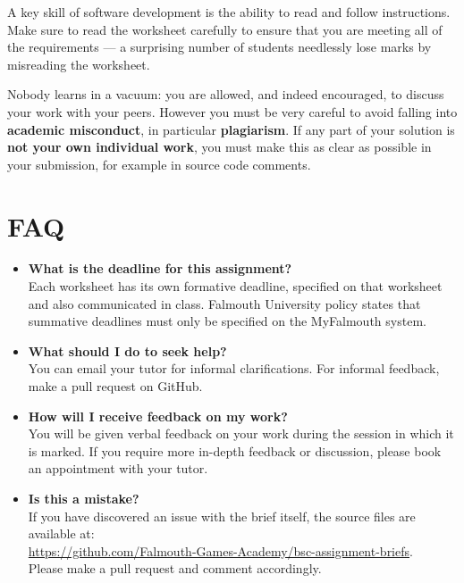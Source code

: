 \documentclass{../../fal_assignment}
\begin{document}
A key skill of software development is the ability to read and follow instructions.
Make sure to read the worksheet carefully to ensure that you are meeting all of the requirements ---
a surprising number of students needlessly lose marks by misreading the worksheet.

Nobody learns in a vacuum: you are allowed, and indeed encouraged, to discuss your work with your peers. However you must be very careful to avoid falling into \textbf{academic misconduct}, in particular \textbf{plagiarism}. If any part of your solution is \textbf{not your own individual work}, you must make this as clear as possible in your submission, for example in source code comments.

\section*{FAQ}

\begin{itemize}
	\item 	\textbf{What is the deadline for this assignment?} \\ 
			Each worksheet has its own formative deadline, specified on that worksheet and also communicated in class.
    		Falmouth University policy states that summative deadlines must only be specified on the MyFalmouth system.
    		
	\item 	\textbf{What should I do to seek help?} \\ 
    		You can email your tutor for informal clarifications. For informal feedback, make a pull request on GitHub. 
    		
	\item 	\textbf{How will I receive feedback on my work?} \\ 
    		You will be given verbal feedback on your work during the session in which it is marked.
    		If you require more in-depth feedback or discussion, please book an appointment with your tutor.
    		
    	\item 	\textbf{Is this a mistake?} \\ 	
    		If you have discovered an issue with the brief itself, the source files are available at: \\
    		\url{https://github.com/Falmouth-Games-Academy/bsc-assignment-briefs}.\\
    		 Please make a pull request and comment accordingly.
\end{itemize}
\end{document}
